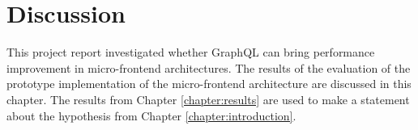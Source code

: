 \documentclass[MSE,Master,english]{twbook}%
\begin{document}

\fi



\chapter{Discussion}\label{chapter:discussion}

This project report investigated whether GraphQL can bring performance improvement in micro-frontend architectures. The results of the evaluation of the prototype implementation of the micro-frontend architecture are discussed in this chapter. The results from Chapter \ref{chapter:results} are used to make a statement about the hypothesis from Chapter \ref{chapter:introduction}.
\end{document}
